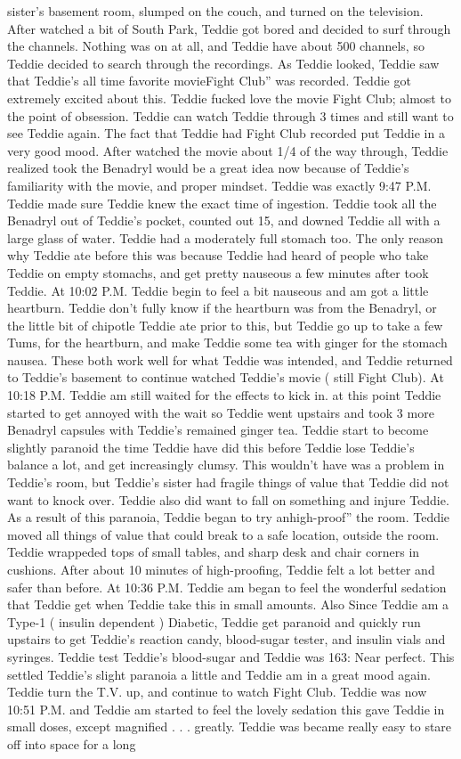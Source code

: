\documentclass[12pt]{book}
\begin{document}
sister's basement room, slumped on the couch, and turned on the television. After watched a bit of South Park, Teddie got bored and decided to surf through the channels. Nothing was on at all, and Teddie have about 500 channels, so Teddie decided to search through the recordings. As Teddie looked, Teddie saw that Teddie's all time favorite movieFight Club'' was recorded. Teddie got extremely excited about this. Teddie fucked love the movie Fight Club; almost to the point of obsession. Teddie can watch Teddie through 3 times and still want to see Teddie again. The fact that Teddie had Fight Club recorded put Teddie in a very good mood. After watched the movie about 1/4 of the way through, Teddie realized took the Benadryl would be a great idea now because of Teddie's familiarity with the movie, and proper mindset. Teddie was exactly 9:47 P.M. Teddie made sure Teddie knew the exact time of ingestion. Teddie took all the Benadryl out of Teddie's pocket, counted out 15, and downed Teddie all with a large glass of water. Teddie had a moderately full stomach too. The only reason why Teddie ate before this was because Teddie had heard of people who take Teddie on empty stomachs, and get pretty nauseous a few minutes after took Teddie. At 10:02 P.M. Teddie begin to feel a bit nauseous and am got a little heartburn. Teddie don't fully know if the heartburn was from the Benadryl, or the little bit of chipotle Teddie ate prior to this, but Teddie go up to take a few Tums, for the heartburn, and make Teddie some tea with ginger for the stomach nausea. These both work well for what Teddie was intended, and Teddie returned to Teddie's basement to continue watched Teddie's movie ( still Fight Club). At 10:18 P.M. Teddie am still waited for the effects to kick in. at this point Teddie started to get annoyed with the wait so Teddie went upstairs and took 3 more Benadryl capsules with Teddie's remained ginger tea. Teddie start to become slightly paranoid the time Teddie have did this before Teddie lose Teddie's balance a lot, and get increasingly clumsy. This wouldn't have was a problem in Teddie's room, but Teddie's sister had fragile things of value that Teddie did not want to knock over. Teddie also did want to fall on something and injure Teddie. As a result of this paranoia, Teddie began to try anhigh-proof'' the room. Teddie moved all things of value that could break to a safe location, outside the room. Teddie wrappeded tops of small tables, and sharp desk and chair corners in cushions. After about 10 minutes of high-proofing, Teddie felt a lot better and safer than before. At 10:36 P.M. Teddie am began to feel the wonderful sedation that Teddie get when Teddie take this in small amounts. Also Since Teddie am a Type-1 ( insulin dependent ) Diabetic, Teddie get paranoid and quickly run upstairs to get Teddie's reaction candy, blood-sugar tester, and insulin vials and syringes. Teddie test Teddie's blood-sugar and Teddie was 163: Near perfect. This settled Teddie's slight paranoia a little and Teddie am in a great mood again. Teddie turn the T.V. up, and continue to watch Fight Club. Teddie was now 10:51 P.M. and Teddie am started to feel the lovely sedation this gave Teddie in small doses, except magnified . . .  greatly. Teddie was became really easy to stare off into space for a long 
\end{document}
